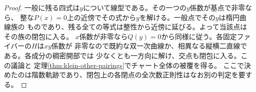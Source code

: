 \begin{proof}
一般に残る四式は$y$について線型である。その一つの$y$係数が基点で非零なら、
整な$P(x)=0$上の近傍でその式から$y$を解ける。一般点でその$y$は楕円曲線族の
ものであり、残る全ての等式は整性から近傍に延びる。よって当該点はその族の閉包に入る。
$x$係数が非零なら$Q(y)=0$から同様に従う。各固定ファイバーの$H$は$xy$係数が
非零なので既約な双一次曲線か、相異なる縦横二直線である。各成分の稠密開部では
少なくとも一方向に解け、交点も閉包に入る。この議論と
定理\ref{thm:klein-other-pairings}でチャート全体の被覆を得る。
ここで決めたのは階数軌跡であり、閉包上の各閉点の全次数正則性はなお別の判定を要する。
\end{proof}
